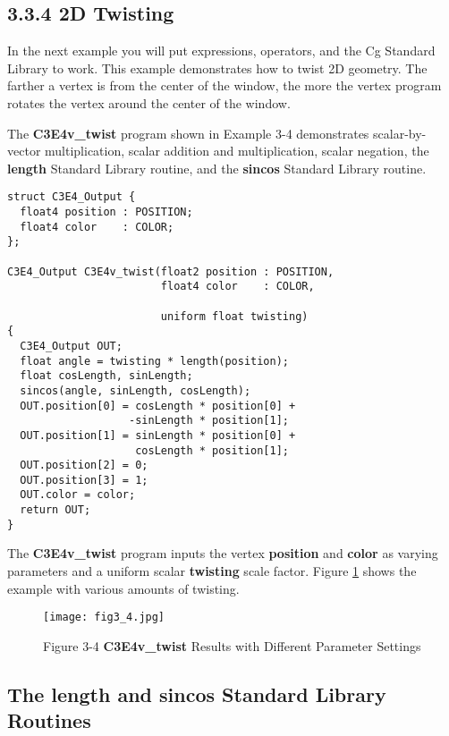 \documentclass[../main.tex]{subfiles}
\begin{document}
\subsection{3.3.4 2D Twisting}

In the next example you will put expressions, operators, and the Cg Standard Library to work. This example demonstrates how to twist 2D geometry. The farther a vertex is from the center of the window, the more the vertex program rotates the vertex around the center of the window.

The \textbf{C3E4v_twist} program shown in Example 3-4 demonstrates scalar-by-vector multiplication, scalar addition and multiplication, scalar negation, the \textbf{length} Standard Library routine, and the \textbf{sincos} Standard Library routine.

\FloatBarrier
\begin{lstlisting}[caption=Example 3-4. The \textbf{C3E4v_twist} Vertex Program]
struct C3E4_Output {
  float4 position : POSITION;
  float4 color    : COLOR;
};

C3E4_Output C3E4v_twist(float2 position : POSITION,
                        float4 color    : COLOR,

                        uniform float twisting)
{
  C3E4_Output OUT;
  float angle = twisting * length(position);
  float cosLength, sinLength;
  sincos(angle, sinLength, cosLength);
  OUT.position[0] = cosLength * position[0] +
                   -sinLength * position[1];
  OUT.position[1] = sinLength * position[0] +
                    cosLength * position[1];
  OUT.position[2] = 0;
  OUT.position[3] = 1;
  OUT.color = color;
  return OUT;
}
\end{lstlisting}
\FloatBarrier

The \textbf{C3E4v_twist} program inputs the vertex \textbf{position} and \textbf{color} as varying parameters and a uniform scalar \textbf{twisting} scale factor. Figure \ref{fig:3-4} shows the example with various amounts of twisting.

\begin{figure}
    \centering
    \texttt{[image: fig3\_4.jpg]}
    \caption{Figure 3-4 \textbf{C3E4v_twist} Results with Different Parameter Settings}
    \label{fig:3-4}
\end{figure}

\subsection*{The length and sincos Standard Library Routines}
\end{document}
